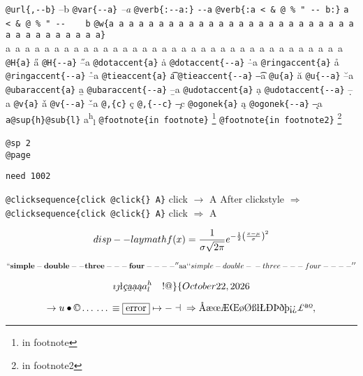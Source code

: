 \documentclass{book}
\begin{document}
\texttt{@url\{,{-}{-}b\}} --b
\texttt{@var\{{-}{-}a\}} \textsl{--a}
\texttt{@verb\{:{-}{-}a:\}} \verb:--a:
\texttt{@verb\{:a  < \& @ \% " {-}{-}    b:\}} \verb:a  < & @ % " --    b:
\texttt{@w\{a a a a a a a a a a a a a a a a a a a a a a a a a a a a a a a a a a a\}} \hbox{a a a a a a a a a a a a a a a a a a a a a a a a a a a a a a a a a a a}
\texttt{@H\{a\}} \H{a}
\texttt{@H\{{-}{-}a\}} \H{--a}
\texttt{@dotaccent\{a\}} \.{a}
\texttt{@dotaccent\{{-}{-}a\}} \.{--a}
\texttt{@ringaccent\{a\}} \r{a}
\texttt{@ringaccent\{{-}{-}a\}} \r{--a}
\texttt{@tieaccent\{a\}} \t{a}
\texttt{@tieaccent\{{-}{-}a\}} \t{--a}
\texttt{@u\{a\}} \u{a}
\texttt{@u\{{-}{-}a\}} \u{--a}
\texttt{@ubaraccent\{a\}} \b{a}
\texttt{@ubaraccent\{{-}{-}a\}} \b{--a}
\texttt{@udotaccent\{a\}} \d{a}
\texttt{@udotaccent\{{-}{-}a\}} \d{--a}
\texttt{@v\{a\}} \v{a}
\texttt{@v\{{-}{-}a\}} \v{--a}
\texttt{@,\{c\}} \c{c}
\texttt{@,\{{-}{-}c\}} \c{--c}
\texttt{@ogonek\{a\}} \k{a}
\texttt{@ogonek\{{-}{-}a\}} \k{--a}
\texttt{a@sup\{h\}@sub\{l\}} a\textsuperscript{h}\textsubscript{l}
\texttt{@footnote\{in footnote\}} \footnote{in footnote}
\texttt{@footnote\{in footnote2\}} \footnote{in footnote2}

\texttt{@sp 2}\leavevmode{}\\
\baselineskip %
\texttt{@page}\leavevmode{}\\
\newpage{}%
\phantom{blabla}%

\texttt{need 1002}
\needspace{1.002pt}%

\texttt{@clicksequence\{click @click\{\} A\}} click $\rightarrow{}$ A
After clickstyle $\Rightarrow{}$
\texttt{@clicksequence\{click @click\{\} A\}} click $\Rightarrow{}$ A


$$
disp--laymath
f(x) = {1 \over \sigma \sqrt{2\pi}}e^{-{1 \over 2}\left({x-\mu \over \sigma}\right)^2}
$$

$$
\mathbf{``simple-double--three---four----''} \hbox{aa}
`\hbox{}`simple-double-\hbox{}-three---four----'\hbox{}'
$$

$$
\imath{} \jmath{}
\mathord{\text{\l{}}} \textsl{\c{c}}
\textsl{\b{a}} \textsl{\d{a}} \textsl{\k{a}} a^{h}_{l}
 \ {}\ {} \ {}\-{}  ! @ \} \{ 
\today{}
$$

$$
\rightarrow{}
u
\bullet{} \copyright{} \dots{} \dots{} \equiv{}
\fbox{error} \mapsto{} - \dashv{} \Rightarrow{}
\mathord{\text{\AA{}}} \mathord{\text{\ae{}}} \mathord{\text{\oe{}}} \mathord{\text{\AE{}}} \mathord{\text{\OE{}}} \mathord{\text{\o{}}} \mathord{\text{\O{}}} \mathord{\text{\ss{}}} \mathord{\text{\l{}}} \mathord{\text{\L{}}} \mathord{\text{\DH{}}}
\mathord{\text{\TH{}}} \mathord{\text{\dh{}}} \mathord{\text{\th{}}} \mathord{\text{\textexclamdown{}}} \mathord{\text{\textquestiondown{}}} \mathsterling{}
\mathord{\text{\textordfeminine{}}} \mathord{\text{\textordmasculine{}}} , 
$$
\end{document}
